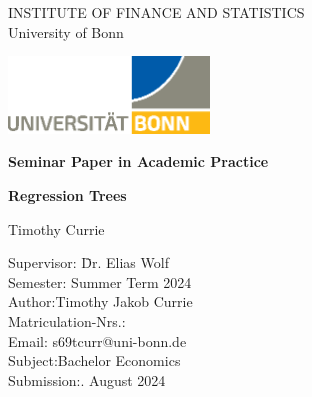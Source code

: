 \thispagestyle{empty}

\begin{center}

    \vspace*{-8mm}

    {\LARGE INSTITUTE OF FINANCE AND STATISTICS\\[1mm]}
    \large University of Bonn\\

    \vspace*{1cm}

    \includegraphics[width=0.4\textwidth]{./Graphics/UNI_Bonn_Logo_Standard_RZ.eps}

    \vspace*{1cm}

    {\Large \textbf{Seminar Paper in Academic Practice}}\\

    \vspace{1cm}

    {\Large \textbf{Regression Trees}}\\
    \vspace{1.5cm}

    {\LARGE Timothy Currie}\\[15mm]

    \parbox{120mm}{\begin{large}
            \begin{tabbing}
                Supervisor: \hspace{1.8cm} \= Dr. Elias Wolf\\[1.5mm]
                Semester:\> Summer Term 2024\\[1.5mm]
                Author:\>Timothy Jakob Currie\\[1.5mm] %
                Matriculation-Nrs.:\\[1.5mm]
                Email:\> s69tcurr@uni-bonn.de\\[1.5mm]
                Subject:\>Bachelor Economics\\[1.5mm]
                Submission:. August 2024\\[1.5mm]
            \end{tabbing}
        \end{large}
    }

\end{center}
\clearpage{\pagestyle{empty}\cleardoublepage}

